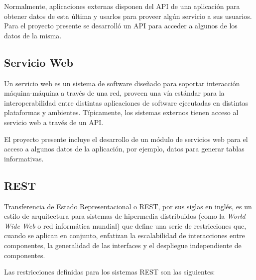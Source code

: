     Normalmente, aplicaciones externas disponen del API de una aplicación para obtener datos de esta última y usarlos para proveer algún servicio a sus usuarios. Para el proyecto presente se desarrolló un API para acceder a algunos de los datos de la misma.

    \subsection{Servicio Web} \label{webService}
    Un servicio web es un sistema de software diseñado para soportar interacción máquina-máquina a través de una red, proveen una vía estándar para la interoperabilidad entre distintas aplicaciones de software ejecutadas en distintas plataformas y ambientes. \cite{webServiceW3C} Típicamente, los sistemas externos tienen acceso al servicio web a través de un API.

    El proyecto presente incluye el desarrollo de un módulo de servicios web para el acceso a algunos datos de la aplicación, por ejemplo, datos para generar tablas informativas.

    \subsection{REST}
    Transferencia de Estado Representacional o REST, por sus siglas en inglés, es un estilo de arquitectura para sistemas de hipermedia distribuidos (como la \textit{World Wide Web} o red informática mundial) que define una serie de restricciones que, cuando se aplican en conjunto, enfatizan la escalabilidad de interacciones entre componentes, la generalidad de las interfaces y el despliegue independiente de componentes. \cite{restFielding}

    Las restricciones definidas para los sistemas REST son las siguientes:

